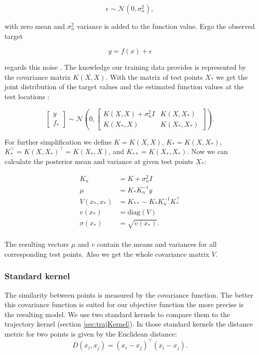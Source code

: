 $$\epsilon \sim \mathcal{N}(0,\sigma_n^2),$$

with zero mean and $\sigma_n^2$ variance is added to the function value. Ergo the observed target

$$y = f(x) + \epsilon$$

regards this noise \cite{brochu2010tutorial,rasmussen2006gaussian,lizotte2008practical,shahriari2016taking}. The knowledge our training data provides is represented by the covariance matrix $K(X,X)$. With the matrix of test points $X_*$ we get the joint distribution of the target values and the estimated function values at the test locations \cite{rasmussen2006gaussian}:

$$\left[ \begin{array}{c} y \\ f_* \end{array} \right] \sim \mathcal{N} \left(0, \begin{bmatrix} K(X,X)+\sigma_n^2 I & K(X,X_*) \\ K(X_*,X) & K(X_*,X_*) \end{bmatrix} \right).$$

For further simplification we define $K = K(X,X)$, $K_* = K(X,X_*)$, $K_*^{\top} = K(X,X_*)^{\top} = K(X_*,X)$, and $K_{**} = K(X_*,X_*)$. Now we can calculate the posterior mean and variance at given test points $X_*$:

\begin{align}
    K_n &= K+\sigma_n^2 I \label{eq:kNoise} \\
    \mu &= K_*K_n^{-1}y \label{eq:meanGauss} \\
    V(x_*,x_*) &= K_{**}-K_*K_n^{-1}K_*^\top \label{eq:wholeVar} \\
    v(x_*) &= \mathrm{diag}(V) \label{eq:vectorVar} \\
    \sigma(x_*) &= \sqrt{v(x_*)}. \label{eq:gp:stdv}\\ \nonumber
\end{align}

The resulting vectors $\mu$ and $v$ contain the means and variances for all corresponding test points. Also we get the whole covariance matrix $V$.

\subsubsection{Standard kernel}
The similarity between points is measured by the covariance function. The better this covariance function is suited for our objective function the more precise is the resulting model.
We use two standard kernels \cite{rasmussen2006gaussian} to compare them to the trajectory kernel (section \ref{sec:trajKernel}). In those standard kernels the distance metric for two points is given by the Euclidean distance:
$$D(x_i,x_j) = (x_i-x_j)^\top (x_i-x_j).$$

